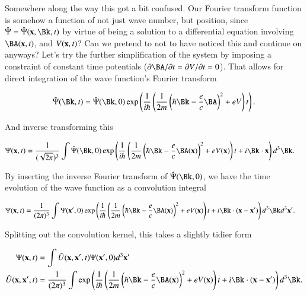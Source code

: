 Somewhere along the way this got a bit confused.  Our Fourier transform function is somehow a function of not just wave number, but position, since $\hat{\Psi} = \hat{\Psi}(\Bx, \Bk, t)$ by virtue of being a solution to a differential equation involving $\BA(\Bx,t)$, and $V(\mathbf{x}, t)$?  Can we pretend to not to have noticed this and continue on anyways?  Let's try the further simplification of the system by imposing a constraint of constant time potentials ($\PDi{t}{\BA} = \PDi{t}{V} = 0$).  That allows for direct integration of the wave function's Fourier transform

\begin{align}\label{eqn:pauliFourier:7}
\hat{\Psi}(\Bk, t) = \hat{\Psi}(\Bk, 0) \exp\left(
\inv{i \hbar} \left( \inv{2m} \left( \hbar \Bk - \frac{e}{c} \BA \right)^2 + e V \right) t
\right).
\end{align}

And inverse transforming this

\begin{align}\label{eqn:pauliFourier:8}
\Psi(\Bx, t) &= \inv{(\sqrt{2 \pi})^3} \int 
\hat{\Psi}(\Bk, 0) \exp\left(
\inv{i \hbar} \left( \inv{2m} \left( \hbar \Bk - \frac{e}{c} \BA(\Bx) \right)^2 + e V(\Bx) \right) t
+ i \Bk \cdot \Bx
\right)
d^3 \Bk.
\end{align}

By inserting the inverse Fourier transform of $\hat{\Psi}(\Bk, 0)$, we have the time evolution of the wave function as a convolution integral

\begin{align}\label{eqn:pauliFourier:9}
\Psi(\Bx, t) &= \inv{(2 \pi)^3} \int 
\Psi(\Bx', 0) \exp\left(
\inv{i \hbar} \left( \inv{2m} \left( \hbar \Bk - \frac{e}{c} \BA(\Bx) \right)^2 + e V(\Bx) \right) t
+ i \Bk \cdot (\Bx - \Bx')
\right)
d^3 \Bk d^3 \Bx'.
\end{align}

Splitting out the convolution kernel, this takes a slightly tidier form

\begin{subequations}
\begin{align}\label{eqn:pauliFourier:10}
\Psi(\Bx, t) &= 
\int \hat{U}(\Bx, \Bx', t) \Psi(\Bx', 0) d^3 \Bx' \\
\hat{U}(\Bx, \Bx', t) &= 
\inv{(2 \pi)^3} 
\int
\exp\left(
\inv{i \hbar} \left( \inv{2m} \left( \hbar \Bk - \frac{e}{c} \BA(\Bx) \right)^2 + e V(\Bx) \right) t
+ i \Bk \cdot (\Bx - \Bx')
\right)
d^3 \Bk.
\end{align}
\end{subequations}

